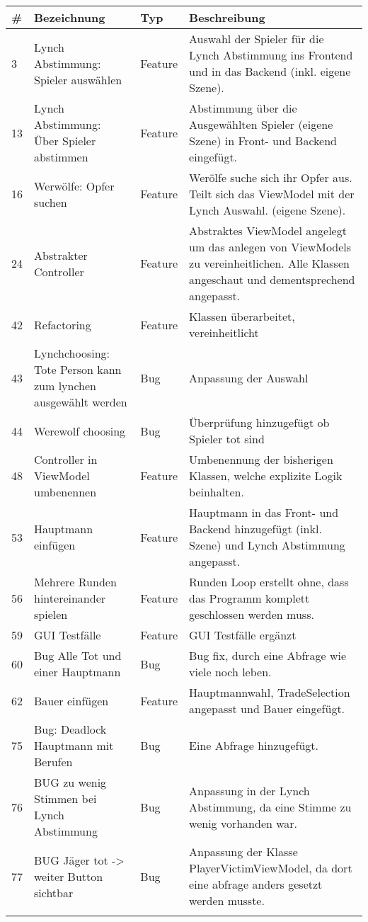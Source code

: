 \begin{tabularx}{\textwidth}{|l|p{4.5cm}|l|X|}
	\hline                                              %
	\textbf{\#}  &    \textbf{Bezeichnung}  &    \textbf{Typ}  & \textbf{Beschreibung}	 \\ 
	\hline \hline      
	\endhead
	
	3 \label{iss:3}	&	Lynch Abstimmung: Spieler auswählen	&	Feature	&	Auswahl der Spieler für die Lynch Abstimmung ins Frontend und in das Backend (inkl. eigene Szene). \\ \hline
	13 \label{iss:13}	&	Lynch Abstimmung: Über Spieler abstimmen	&	Feature	&	Abstimmung über die Ausgewählten Spieler (eigene Szene) in Front- und Backend eingefügt.  \\ \hline
	16 \label{iss:16}	&	Werwölfe: Opfer suchen	&	Feature	&	Werölfe suche sich ihr Opfer aus. Teilt sich das ViewModel mit der Lynch Auswahl. (eigene Szene).  \\ \hline
	24 \label{iss:24}	&	Abstrakter Controller 	&	Feature	&	Abstraktes ViewModel angelegt um das anlegen von ViewModels zu vereinheitlichen. Alle Klassen angeschaut und dementsprechend angepasst.  \\ \hline
	42 \label{iss:42}	&	Refactoring	&	Feature	&	Klassen überarbeitet, vereinheitlicht    \\ \hline
	43 \label{iss:43}	&	Lynchchoosing: Tote Person kann zum lynchen ausgewählt werden	&	Bug	&	Anpassung der Auswahl \\ \hline
	44 \label{iss:44}	&	Werewolf choosing	&	Bug	& Überprüfung hinzugefügt ob Spieler tot sind  \\ \hline
	48 \label{iss:48}	&	Controller in ViewModel umbenennen	&	Feature	&	Umbenennung der bisherigen Klassen, welche explizite Logik beinhalten.  \\ \hline
	53 \label{iss:53}	&	Hauptmann einfügen	&	Feature	&	Hauptmann in das Front- und Backend hinzugefügt (inkl. Szene) und Lynch Abstimmung angepasst.   \\ \hline
	56 \label{iss:56}	&	Mehrere Runden hintereinander spielen	&	Feature	&	Runden Loop erstellt ohne, dass das Programm komplett geschlossen werden muss.  \\ \hline
	59 \label{iss:59-3}	&	GUI Testfälle	&	Feature	&	GUI Testfälle ergänzt  \\ \hline
	60 \label{iss:60}	&	Bug Alle Tot und einer Hauptmann	&	Bug	&	Bug fix, durch eine Abfrage wie viele noch leben.  \\ \hline
	62 \label{iss:62}	&	Bauer einfügen	&	Feature	&	Hauptmannwahl, TradeSelection angepasst und Bauer eingefügt.  \\ \hline
	75 \label{iss:75}	&	Bug: Deadlock Hauptmann mit Berufen	&	Bug	&	Eine Abfrage hinzugefügt.  \\ \hline
	76 \label{iss:76}	&	BUG zu wenig Stimmen bei Lynch Abstimmung	&	Bug	&	Anpassung in der Lynch Abstimmung, da eine Stimme zu wenig vorhanden war.    \\ \hline
	77 \label{iss:77}	&	BUG Jäger tot -> weiter Button sichtbar	&	Bug	&	Anpassung der Klasse PlayerVictimViewModel, da dort eine abfrage anders gesetzt werden musste.   \\ \hline
\caption{Tätigkeiten Florian Müller}\label{tbl:florian}
\end{tabularx}